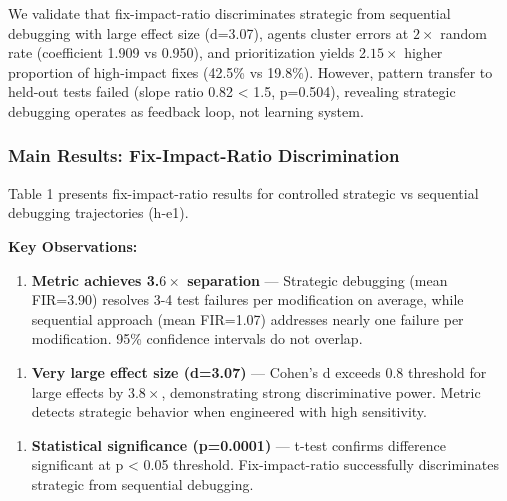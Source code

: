 
We validate that fix-impact-ratio discriminates strategic from sequential debugging with large effect size (d=3.07), agents cluster errors at $2\times$ random rate (coefficient 1.909 vs 0.950), and prioritization yields 2.$15\times$ higher proportion of high-impact fixes (42.5\% vs 19.8\%). However, pattern transfer to held-out tests failed (slope ratio 0.82 < 1.5, p=0.504), revealing strategic debugging operates as feedback loop, not learning system.

\subsubsection{Main Results: Fix-Impact-Ratio Discrimination}

Table 1 presents fix-impact-ratio results for controlled strategic vs sequential debugging trajectories (h-e1).

\begin{table}[htbp]
\centering
{}
\end{table}

\textbf{Key Observations:}

\begin{enumerate}
\item \textbf{Metric achieves 3.$6\times$ separation} --- Strategic debugging (mean FIR=3.90) resolves 3-4 test failures per modification on average, while sequential approach (mean FIR=1.07) addresses nearly one failure per modification. 95\% confidence intervals do not overlap.
\end{enumerate}

\begin{enumerate}
\item \textbf{Very large effect size (d=3.07)} --- Cohen's d exceeds 0.8 threshold for large effects by 3.$8\times$, demonstrating strong discriminative power. Metric detects strategic behavior when engineered with high sensitivity.
\end{enumerate}

\begin{enumerate}
\item \textbf{Statistical significance (p=0.0001)} --- t-test confirms difference significant at p < 0.05 threshold. Fix-impact-ratio successfully discriminates strategic from sequential debugging.
\end{enumerate}

